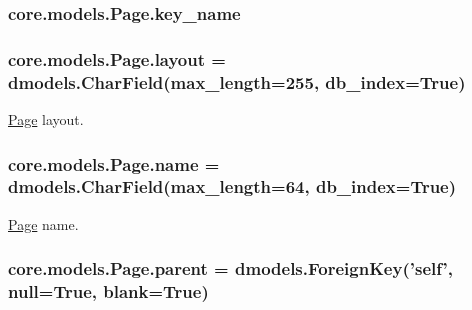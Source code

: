 \hypertarget{classcore_1_1models_1_1Page_a25178e4dfd9fafc8e1e6dea92ed53471}{
\subsubsection[{key\-\_\-name}]{\setlength{\rightskip}{0pt plus 5cm}core.\-models.\-Page.\-key\-\_\-name}}\label{classcore_1_1models_1_1Page_a25178e4dfd9fafc8e1e6dea92ed53471}
\hypertarget{classcore_1_1models_1_1Page_a2f5022d3c036a292307aa93776e9ef0a}{
\subsubsection[{layout}]{\setlength{\rightskip}{0pt plus 5cm}core.\-models.\-Page.\-layout = dmodels.\-Char\-Field(max\-\_\-length=255, db\-\_\-index=True)\hspace{0.3cm}{\ttfamily [static]}}}\label{classcore_1_1models_1_1Page_a2f5022d3c036a292307aa93776e9ef0a}


\hyperlink{classcore_1_1models_1_1Page}{Page} layout. 

\hypertarget{classcore_1_1models_1_1Page_a6d9d0e7d9e679e159e300f5664dc30f3}{
\subsubsection[{name}]{\setlength{\rightskip}{0pt plus 5cm}core.\-models.\-Page.\-name = dmodels.\-Char\-Field(max\-\_\-length=64, db\-\_\-index=True)\hspace{0.3cm}{\ttfamily [static]}}}\label{classcore_1_1models_1_1Page_a6d9d0e7d9e679e159e300f5664dc30f3}


\hyperlink{classcore_1_1models_1_1Page}{Page} name. 

\hypertarget{classcore_1_1models_1_1Page_a78ec187207c0e8f2c223693265a67482}{
\subsubsection[{parent}]{\setlength{\rightskip}{0pt plus 5cm}core.\-models.\-Page.\-parent = dmodels.\-Foreign\-Key('self', null=True, blank=True)\hspace{0.3cm}{\ttfamily [static]}}}\label{classcore_1_1models_1_1Page_a78ec187207c0e8f2c223693265a67482}


